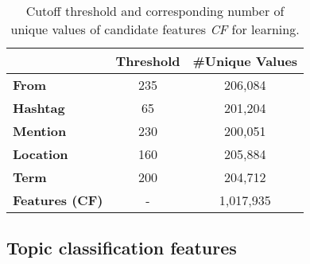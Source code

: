 




\begin{table}[t!]
\vspace{-0.5mm}
\centering
\caption{Cutoff threshold and corresponding number of unique values of candidate features \textit{CF} for learning.}
{%
\def\arraystretch{1.2}
\begin{tabular}{|l|c|c|}
\hline
 & \textbf{Threshold} & \textbf{\#Unique Values} \\ \hline \hline
\textbf{From} & 235 &  206,084 \\ \hline
\textbf{Hashtag} & 65 & 201,204 \\ \hline
\textbf{Mention} & 230 & 200,051 \\ \hline
\textbf{Location} & 160 & 205,884 \\ \hline
\textbf{Term} & 200 & 204,712 \\ \hline
\hline
\textbf{Features (CF)} & - & 1,017,935 \\ \hline
\end{tabular}
}
\vspace{-1mm}
\label{table:learningFeatures}
\vspace{-1.5mm}
\end{table}











 

\subsection*{Topic classification features}

